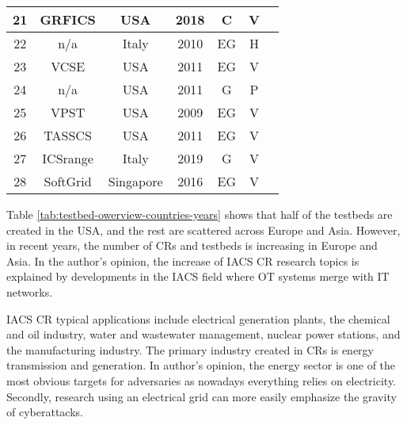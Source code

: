 \begin{longtable}[c]{|c|c|c|c|c|c|p{}|}
	21           & GRFICS        & USA              & 2018          & C              & V             & \cite{39-grfics-scada-simulator}                   \\ \hline
	22           & n/a           & Italy            & 2010          & EG             & H             & \cite{40-scada-testbed}                            \\ \hline
	23           & VCSE          & USA              & 2011          & EG             & V             & \cite{41-vcse-ics-testbed}                         \\ \hline
	24           & n/a           & USA              & 2011          & G              & P             & \cite{43-SCADA-testbed-for-protection-concepts}    \\ \hline
	25           & VPST          & USA              & 2009          & EG             & V             & \cite{46-VPST-testbed-2009}                        \\ \hline
	26           & TASSCS        & USA              & 2011          & EG             & V             & \cite{47-ieee-tasscs-testbed}                      \\ \hline
	27           & ICSrange      & Italy            & 2019          & G              & V             & \cite{48-red-tee-ics-testbed}                      \\ \hline
	28           & SoftGrid      & Singapore        & 2016          & EG             & V             & \cite{50-softgrid-scada-testbed}                   \\ \hline
	
\end{longtable}


Table \ref{tab:testbed-owerview-countries-years} shows that half of the testbeds are created in the USA, and the rest are scattered across Europe and Asia. However, in recent years, the number of CRs and testbeds is increasing in Europe and Asia. In the author's opinion, the increase of IACS CR research topics is explained by developments in the IACS field where OT systems merge with IT networks. 

IACS CR typical applications include electrical generation plants, the chemical and oil industry, water and wastewater management, nuclear power stations, and the manufacturing industry. The primary industry created in CRs is energy transmission and generation. In author's opinion, the energy sector is one of the most obvious targets for adversaries as nowadays everything relies on electricity. Secondly, research using an electrical grid can more easily emphasize the gravity of cyberattacks. 

